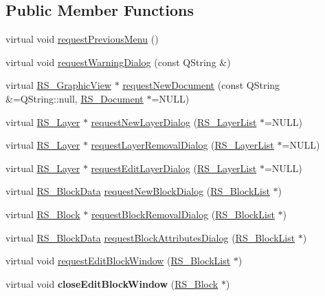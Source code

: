 \subsection*{Public Member Functions}
\begin{DoxyCompactItemize}
\item 
virtual void \hyperlink{classRS__DialogFactoryAdapter_a533678d4205865acb1463913d2a71351}{request\-Previous\-Menu} ()
\item 
virtual void \hyperlink{classRS__DialogFactoryAdapter_a94cd2980e95cbdc2d458075b6a895192}{request\-Warning\-Dialog} (const Q\-String \&)
\item 
virtual \hyperlink{classRS__GraphicView}{R\-S\-\_\-\-Graphic\-View} $\ast$ \hyperlink{classRS__DialogFactoryAdapter_a66fc861e1d0b4bc627ead407df82043a}{request\-New\-Document} (const Q\-String \&=Q\-String\-::null, \hyperlink{classRS__Document}{R\-S\-\_\-\-Document} $\ast$=N\-U\-L\-L)
\item 
virtual \hyperlink{classRS__Layer}{R\-S\-\_\-\-Layer} $\ast$ \hyperlink{classRS__DialogFactoryAdapter_ad6fa5594675e787303c4f090a1615f76}{request\-New\-Layer\-Dialog} (\hyperlink{classRS__LayerList}{R\-S\-\_\-\-Layer\-List} $\ast$=N\-U\-L\-L)
\item 
virtual \hyperlink{classRS__Layer}{R\-S\-\_\-\-Layer} $\ast$ \hyperlink{classRS__DialogFactoryAdapter_a1565c347c48901be2b8b47201d091f3c}{request\-Layer\-Removal\-Dialog} (\hyperlink{classRS__LayerList}{R\-S\-\_\-\-Layer\-List} $\ast$=N\-U\-L\-L)
\item 
virtual \hyperlink{classRS__Layer}{R\-S\-\_\-\-Layer} $\ast$ \hyperlink{classRS__DialogFactoryAdapter_af82a6f492bb12dd5d5dab9702adc20e5}{request\-Edit\-Layer\-Dialog} (\hyperlink{classRS__LayerList}{R\-S\-\_\-\-Layer\-List} $\ast$=N\-U\-L\-L)
\item 
virtual \hyperlink{classRS__BlockData}{R\-S\-\_\-\-Block\-Data} \hyperlink{classRS__DialogFactoryAdapter_ad90c38137424badb571cd325e8742486}{request\-New\-Block\-Dialog} (\hyperlink{classRS__BlockList}{R\-S\-\_\-\-Block\-List} $\ast$)
\item 
virtual \hyperlink{classRS__Block}{R\-S\-\_\-\-Block} $\ast$ \hyperlink{classRS__DialogFactoryAdapter_a7d03fe55254410b4c2f629925d14fd76}{request\-Block\-Removal\-Dialog} (\hyperlink{classRS__BlockList}{R\-S\-\_\-\-Block\-List} $\ast$)
\item 
virtual \hyperlink{classRS__BlockData}{R\-S\-\_\-\-Block\-Data} \hyperlink{classRS__DialogFactoryAdapter_a002eea58808a416ed39fcfe89e47c05b}{request\-Block\-Attributes\-Dialog} (\hyperlink{classRS__BlockList}{R\-S\-\_\-\-Block\-List} $\ast$)
\item 
virtual void \hyperlink{classRS__DialogFactoryAdapter_a75419fc35f524fdce175419b485d3cfe}{request\-Edit\-Block\-Window} (\hyperlink{classRS__BlockList}{R\-S\-\_\-\-Block\-List} $\ast$)
\item 
\hypertarget{classRS__DialogFactoryAdapter_a17bbdf6e2c58a2ea67e477e01e09c8a1}{virtual void {\bfseries close\-Edit\-Block\-Window} (\hyperlink{classRS__Block}{R\-S\-\_\-\-Block} $\ast$)}\label{classRS__DialogFactoryAdapter_a17bbdf6e2c58a2ea67e477e01e09c8a1}


\end{DoxyCompactItemize}
